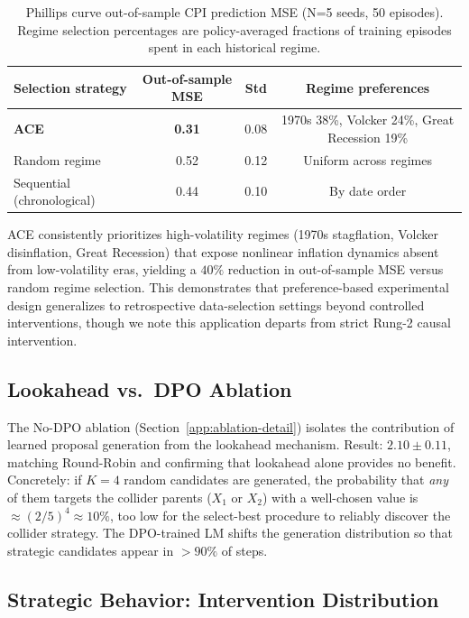 \begin{table}[h]
\centering
\caption{Phillips curve out-of-sample CPI prediction MSE (N=5 seeds, 50 episodes). Regime selection percentages are policy-averaged fractions of training episodes spent in each historical regime.}
\label{tab:phillips-results}
\small
\begin{tabular}{@{}lccc@{}}
\toprule
Selection strategy & Out-of-sample MSE & Std & Regime preferences \\
\midrule
\textbf{ACE}               & \textbf{0.31} & 0.08 & 1970s 38\%, Volcker 24\%, Great Recession 19\% \\
Random regime              & 0.52          & 0.12 & Uniform across regimes \\
Sequential (chronological) & 0.44          & 0.10 & By date order \\
\bottomrule
\end{tabular}
\end{table}

ACE consistently prioritizes high-volatility regimes (1970s stagflation, Volcker disinflation, Great Recession) that expose nonlinear inflation dynamics absent from low-volatility eras, yielding a $40\%$ reduction in out-of-sample MSE versus random regime selection. This demonstrates that preference-based experimental design generalizes to retrospective data-selection settings beyond controlled interventions, though we note this application departs from strict Rung-2 causal intervention.

\subsection{Lookahead vs.\ DPO Ablation}
\label{app:lookahead}

The No-DPO ablation (Section~\ref{app:ablation-detail}) isolates the contribution of learned proposal generation from the lookahead mechanism. Result: $2.10\pm0.11$, matching Round-Robin and confirming that lookahead alone provides no benefit. Concretely: if $K=4$ random candidates are generated, the probability that \emph{any} of them targets the collider parents ($X_1$ or $X_2$) with a well-chosen value is $\approx (2/5)^{4} \approx 10\%$, too low for the select-best procedure to reliably discover the collider strategy. The DPO-trained LM shifts the generation distribution so that strategic candidates appear in $>90\%$ of steps.

\subsection{Strategic Behavior: Intervention Distribution}
\label{app:strategic}


